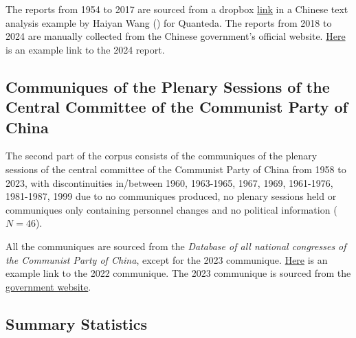 \documentclass[
  letterpaper,
  abstract=true]{scrartcl}
\begin{document}
The reports from 1954 to 2017 are sourced from a dropbox
\href{https://www.dropbox.com/s/37ojd5knz1qeyul/data_corpus_chinesegovreport.rds?dl=1}{link}
in a Chinese text analysis example by Haiyan Wang
() for Quanteda. The reports from 2018 to 2024
are manually collected from the Chinese government's official website.
\href{https://www.gov.cn/yaowen/liebiao/202403/content_6939153.htm}{Here}
is an example link to the 2024 report.

\subsection{Communiques of the Plenary Sessions of the Central Committee
of the Communist Party of
China}\label{communiques-of-the-plenary-sessions-of-the-central-committee-of-the-communist-party-of-china}

The second part of the corpus consists of the communiques of the plenary
sessions of the central committee of the Communist Party of China from
1958 to 2023, with discontinuities in/between 1960, 1963-1965, 1967,
1969, 1961-1976, 1981-1987, 1999 due to no communiques produced, no
plenary sessions held or communiques only containing personnel changes
and no political information (\(N=46\)).

All the communiques are sourced from the \emph{Database of all national
congresses of the Communist Party of China}, except for the 2023
communique.
\href{http://politics.people.com.cn/n1/2022/1013/c1024-32544084.html}{Here}
is an example link to the 2022 communique. The 2023 communique is
sourced from the
\href{https://www.gov.cn/xinwen/2023-02/28/content_5743717.htm}{government
website}.

\subsection{Summary Statistics}\label{summary-statistics}
\end{document}
